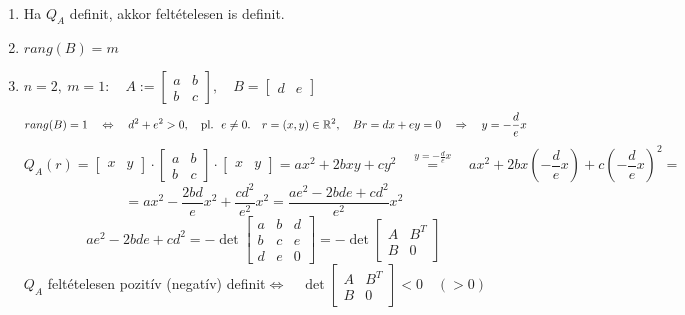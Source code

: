 \documentclass[a4paper,11.5pt]{article}
\begin{document}
	\begin{note}\ 
		
		\begin{enumerate}
			\item Ha $Q_A$ definit, akkor feltételesen is definit.
			
			\item $rang(B)=m$
			
			\item $n=2,\ m=1:\quad A:=\begin{bmatrix}
				a&b\\
				b&c				
			\end{bmatrix},\quad B=\begin{bmatrix}
				d&e
			\end{bmatrix}$
			\[ rang(B)=1\quad \Leftrightarrow\quad d^2+e^2>0,\quad \text{pl.\ \ }e\not=0.\quad r=(x,y)\in\mathbb{R}^2,\quad Br=dx+ey=0\quad \Rightarrow\quad y=-\frac{d}{e}x \]
			\[ Q_A(r)=\begin{bmatrix}
				x&y
			\end{bmatrix}\cdot\begin{bmatrix}
				a&b\\
				b&c
			\end{bmatrix}\cdot\begin{bmatrix}
				x&y
			\end{bmatrix}=ax^2+2bxy+cy^2\quad \overset{y=-\frac{d}{e}x}{=}\quad ax^2+2bx\left(-\frac{d}{e}x\right)+c\left(-\frac{d}{e}x\right)^2=\]
			\[=ax^2-\frac{2bd}{e}x^2+\frac{cd^2}{e^2}x^2=\frac{ae^2-2bde+cd^2}{e^2}x^2 \]
			\[ ae^2-2bde+cd^2=-\det \begin{bmatrix}
				a&b&d\\
				b&c&e\\
				d&e&0
			\end{bmatrix}=-\det \begin{bmatrix}
				A&B^T\\
				B&0
			\end{bmatrix} \]
			$Q_A$ feltételesen pozitív (negatív) definit\quad $\Leftrightarrow\quad \det \begin{bmatrix}
				A&B^T\\
				B&0
			\end{bmatrix}<0\quad (>0)$
			

\end{enumerate}
\end{note}
\end{document}
